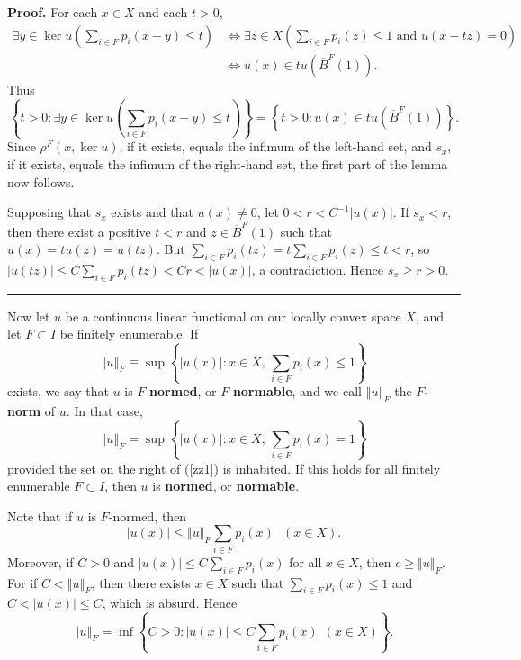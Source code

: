 \documentclass{article}%
\newenvironment{proof}[1][Proof]{\noindent\textbf{#1.} }{\ \rule{0.5em}{0.5em}}
\begin{document}
\begin{proof}
For each $x\in X$ and each $t>0$,%
\begin{align*}
\exists y\in\ker u\left(
{\textstyle\sum_{i\in F}}
p_{i}(x-y)\leq t\right)   &  \Leftrightarrow\exists z\in X\left(  \sum_{i\in
F}p_{i}(z)\leq1\text{ and }u(x-tz)=0\right) \\
&  \Leftrightarrow u(x)\in tu(\overline{B}^{F}(1)).
\end{align*}
Thus%
\[
\left\{  t>0:\exists y\in\ker u\left(
{\textstyle\sum_{i\in F}}
p_{i}(x-y)\leq t\right)  \right\}  =\left\{  t>0:u(x)\in tu(\overline{B}%
^{F}(1))\right\}  .
\]
Since $\rho^{F}(x,\ker u)$, if it exists, equals the infimum of the left-hand
set, and $s_{x}$, if it exists, equals the infimum of the right-hand set, the
first part of the lemma now follows.

Supposing that $s_{x}$ exists and that $u(x)\neq0$, let $0<r<C^{-1}\left\vert
u(x)\right\vert $. If $s_{x}<r$, then there exist a positive $t<r$ and
$z\in\overline{B}^{F}(1)$ such that $u(x)=tu(z)=u(tz)$. But $\sum_{i\in
F}p_{i}(tz)=t\sum_{i\in F}p_{i}(z)\leq t<r$, so $\left\vert u(tz)\right\vert
\leq C\sum_{i\in F}p_{i}(tz)<Cr<\left\vert u(x)\right\vert $, a contradiction.
Hence $s_{x}\geq r>0$.
\end{proof}

%

\medskip


Now let $u$ be a continuous linear functional on our locally convex space $X$,
and let $F\subset I$ be finitely enumerable. If%
\[
\left\Vert u\right\Vert _{F}\equiv\sup\left\{  \left\vert u(x)\right\vert
:x\in X,\,\sum_{i\in F}p_{i}(x)\leq1\right\}
\]
exists, we say that $u$ is $F$-\textbf{normed}, or $F$-\textbf{normable}, and
we call $\left\Vert u\right\Vert _{F}$ the $F$\textbf{-norm} of $u$. In that
case,
\begin{equation}
\left\Vert u\right\Vert _{F}=\sup\left\{  \left\vert u(x)\right\vert :x\in
X,\,\sum_{i\in F}p_{i}(x)=1\right\}  \label{zz1}%
\end{equation}
provided the set on the right of (\ref{zz1}) is inhabited. If this holds for
all finitely enumerable $F\subset I$, then $u$ is \textbf{normed}, or
\textbf{normable}.

Note that if $u$ is $F$-normed, then
\[
\left\vert u(x)\right\vert \leq\left\Vert u\right\Vert _{F}\sum_{i\in F}%
p_{i}(x)\ \ \ (x\in X).
\]
Moreover, if $C>0$ and $\left\vert u(x)\right\vert \leq C\sum_{i\in F}%
p_{i}(x)$ for all $x\in X$, then $c\geq\left\Vert u\right\Vert _{F}$. For if
$C<\left\Vert u\right\Vert _{F}$, then there exists $x\in X$ such that
$\sum_{i\in F}p_{i}(x)\leq1$ and $C<\left\vert u(x)\right\vert \leq C$, which
is absurd. Hence%
\[
\left\Vert u\right\Vert _{F}=\inf\left\{  C>0:\left\vert u(x)\right\vert \leq
C\sum_{i\in F}p_{i}(x)\ \ (x\in X)\right\}  .
\]
\end{document}
